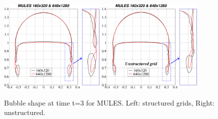 \documentclass[review]{elsarticle}
\begin{document}
\begin{figure}[!h]
\begin{center}
 \includegraphics[width=0.45\textwidth]{figures/bubble_shape_t=3_MULES-struct.pdf}
 \hspace{2mm}
 \includegraphics[width=0.45\textwidth]{figures/bubble_shape_t=3_MULES-uns.pdf}
 \vspace{-6mm}
\end{center}
\caption{Bubble shape at time t=3 for MULES. Left: structured grids, Right: unstructured.}
\label{fig:HB_bubble_shape_3_MULES}
\end{figure}
\end{document}
